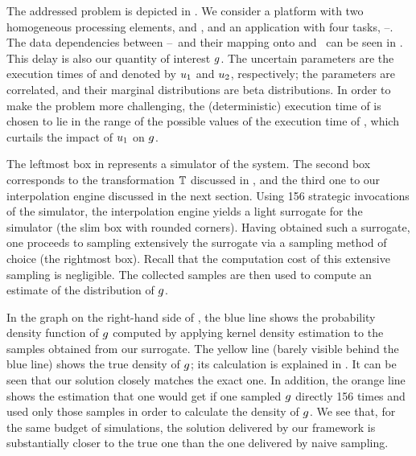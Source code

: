 \newcommand{\cores}{\token{PE1} and \token{PE2}}
\newcommand{\tasks}{\token{T1}--\token{T4}}
The addressed problem is depicted in . We consider a platform with
two homogeneous processing elements, \cores, and an application with four tasks,
\tasks. The data dependencies between \tasks\ and their mapping onto \cores\ can
be seen in . This delay is also our quantity of interest $g$. The
uncertain parameters are the execution times of  and 
denoted by $u_1$ and $u_2$, respectively; the parameters are correlated, and
their marginal distributions are beta distributions. In order to make the
problem more challenging, the (deterministic) execution time of  is
chosen to lie in the range of the possible values of the execution time of
, which curtails the impact of $u_1$ on $g$.

The leftmost box in  represents a simulator of the system. The
second box corresponds to the transformation $\mathbb{T}$ discussed in
, and the third one to our interpolation engine discussed in
the next section. Using 156 strategic invocations of the simulator, the
interpolation engine yields a light surrogate for the simulator (the slim box
with rounded corners). Having obtained such a surrogate, one proceeds to
sampling extensively the surrogate via a sampling method of choice (the
rightmost box). Recall that the computation cost of this extensive sampling is
negligible. The collected samples are then used to compute an estimate of the
distribution of $g$.

In the graph on the right-hand side of , the blue line shows the
probability density function of $g$ computed by applying kernel density
estimation to the samples obtained from our surrogate. The yellow line (barely
visible behind the blue line) shows the true density of $g$; its calculation is
explained in . It can be seen that our solution closely
matches the exact one. In addition, the orange line shows the estimation that
one would get if one sampled $g$ directly 156 times and used only those samples
in order to calculate the density of $g$. We see that, for the same budget of
simulations, the solution delivered by our framework is substantially closer to
the true one than the one delivered by naive sampling.
